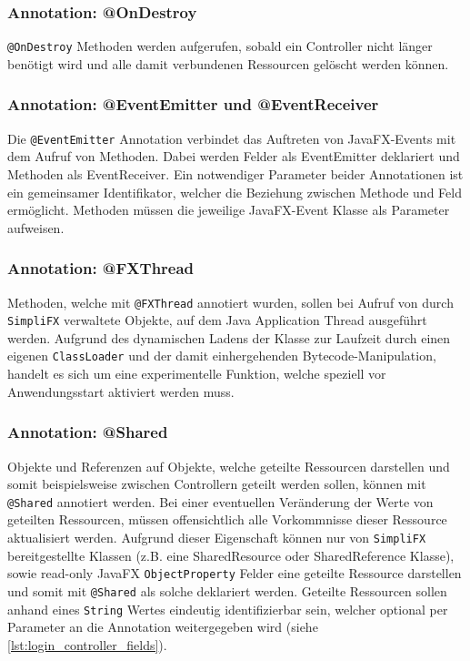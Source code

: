 \subsubsection{Annotation: @OnDestroy}
\texttt{@OnDestroy} Methoden werden aufgerufen, sobald ein Controller nicht länger benötigt wird und alle damit verbundenen Ressourcen gelöscht werden können.
\subsubsection{Annotation: @EventEmitter und @EventReceiver}
Die \texttt{@EventEmitter} Annotation verbindet das Auftreten von JavaFX-Events mit dem Aufruf von Methoden. Dabei werden Felder als EventEmitter deklariert und Methoden als EventReceiver. Ein notwendiger Parameter beider Annotationen ist ein gemeinsamer Identifikator, welcher die Beziehung zwischen Methode und Feld ermöglicht. Methoden müssen die jeweilige JavaFX-Event Klasse als Parameter aufweisen.
\subsubsection{Annotation: @FXThread}
Methoden, welche mit \texttt{@FXThread} annotiert wurden, sollen bei Aufruf von durch \texttt{SimpliFX} verwaltete Objekte, auf dem Java Application Thread ausgeführt werden. Aufgrund des dynamischen Ladens der Klasse zur Laufzeit durch einen eigenen \texttt{ClassLoader} und der damit einhergehenden Bytecode-Manipulation, handelt es sich um eine experimentelle Funktion, welche speziell vor Anwendungsstart aktiviert werden muss.
\subsubsection{Annotation: @Shared}
Objekte und Referenzen auf Objekte, welche geteilte Ressourcen darstellen und somit beispielsweise zwischen Controllern geteilt werden sollen, können mit \texttt{@Shared} annotiert werden. Bei einer eventuellen Veränderung der Werte von geteilten Ressourcen, müssen offensichtlich alle Vorkommnisse dieser Ressource aktualisiert werden. Aufgrund dieser Eigenschaft können nur von \texttt{SimpliFX} bereitgestellte Klassen (z.B. eine SharedResource oder SharedReference Klasse), sowie read-only JavaFX \texttt{ObjectProperty} Felder eine geteilte Ressource darstellen und somit mit \texttt{@Shared} als solche deklariert werden. Geteilte Ressourcen sollen anhand eines \texttt{String} Wertes eindeutig identifizierbar sein, welcher optional per Parameter an die Annotation weitergegeben wird (siehe \autoref{lst:login_controller_fields}).
